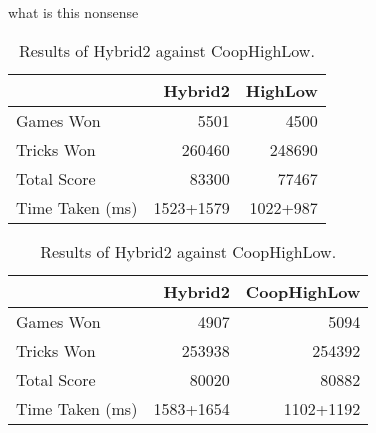 what is this nonsense

\begin{table}[ht]
    \begin{minipage}{.5\linewidth}
        \centering
        \begin{tabular}{l|rr}
            ~               &  Hybrid2 &   HighLow  \\  \hline
            Games Won       &   5501        &   4500   \\
            Tricks Won      &   260460      &   248690 \\
            Total Score     &   83300      &   77467  \\
            Time Taken (ms) &   1523+1579   &   1022+987
        \end{tabular}
        \caption{Results of Hybrid2 against HighLow.}
        \label{tab:hybrid2_highlow}
    \end{minipage}%
    \begin{minipage}{.5\linewidth}
        \centering
        \begin{tabular}{l|rr}
            ~               &  Hybrid2 &   CoopHighLow  \\  \hline
            Games Won       &   4907        &   5094   \\
            Tricks Won      &   253938      &   254392 \\
            Total Score     &   80020      &   80882  \\
            Time Taken (ms) &   1583+1654   &   1102+1192
        \end{tabular}
        \caption{Results of Hybrid2 against CoopHighLow.}
        \label{tab:hybrid2_coophighlow}
    \end{minipage} 
\end{table}


